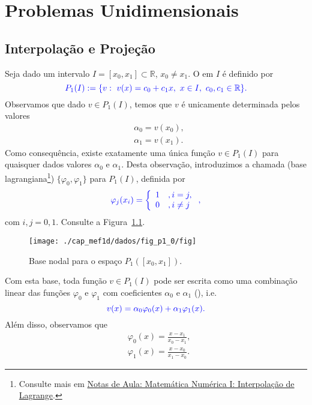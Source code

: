 \chapter{Problemas Unidimensionais}\label{cap_mef1d}
\badgeRevisar

\section{Interpolação e Projeção}\label{cap_mef1d_sec_interproj}
\badgeRevisar

Seja dado um intervalo $I = [x_0, x_1]\subset\mathbb{R}$, $x_0\neq x_1$. O  em $I$ é definido por
\begin{equation}\color{blue}P_1(I) := \{v: ~v(x)=c_0+c_1x,~x\in I,~c_0,c_1\in\mathbb{R}\}.
\end{equation}
Observamos que dado $v\in P_1(I)$, temos que $v$ é unicamente determinada pelos valores
\begin{equation}
  \begin{aligned}
    &\alpha_0 = v(x_0),\\
    &\alpha_1 = v(x_1).
  \end{aligned}
\end{equation}
Como consequência, existe exatamente uma única função $v\in P_1(I)$ para quaisquer dados valores $\alpha_0$ e $\alpha_1$. Desta observação, introduzimos a chamada  (base lagrangiana\footnote{Consulte mais em \href{https://notaspedrok.com.br/notas/MatematicaNumericaI/cap_interp_sec_lagrange.html}{Notas de Aula: Matemática Numérica I: Interpolação de Lagrange}.}) $\{\varphi_0, \varphi_1\}$ para $P_1(I)$, definida por
\begin{equation}\color{blue}\varphi_j(x_i) = \left\{
    \begin{array}{ll}
      1 &, i=j,\\
      0 &, i\neq j
    \end{array}
\right.,
\end{equation}
com $i,j=0, 1$. Consulte a Figura~\ref{fig:p1_0}.

\begin{figure}[H]
  \centering
  \texttt{[image: ./cap\_mef1d/dados/fig\_p1\_0/fig]}
  \caption{Base nodal para o espaço $P_1([x_0, x_1])$.}
  \label{fig:p1_0}
\end{figure}

Com esta base, toda função $v\in P_1(I)$ pode ser escrita como uma combinação linear das funções $\varphi_0$ e $\varphi_1$ com coeficientes $\alpha_0$ e $\alpha_1$ (), i.e.
\begin{equation}\color{blue}v(x) = \alpha_0\varphi_0(x) + \alpha_1\varphi_1(x).
\end{equation}
Além disso, observamos que
\begin{align}
  &\varphi_0(x) = \frac{x-x_1}{x_0-x_1},\\
  &\varphi_1(x) = \frac{x-x_0}{x_1-x_0}.
\end{align}



